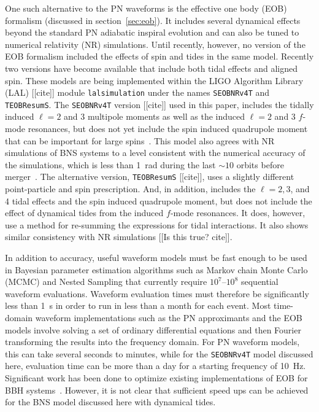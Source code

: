 \documentclass[prd,aps,letter,twocolumn,floatfix,notitlepage,nofootinbib]{revtex4-1}
\begin{document}
One such alternative to the PN waveforms is the effective one body (EOB) formalism (discussed in section~\ref{sec:eob}). It includes several dynamical effects beyond the standard PN adiabatic inspiral evolution and can also be tuned to numerical relativity (NR) simulations. Until recently, however, no version of the EOB formalism included the effects of spin and tides in the same model. Recently two versions have become available that include both tidal effects and aligned spin. These models are being implemented within the LIGO Algorithm Library (LAL) [[cite]] module \texttt{lalsimulation} under the names \texttt{SEOBNRv4T} and \texttt{TEOBResumS}. The \texttt{SEOBNRv4T} version [[cite]] used in this paper, includes the tidally induced $\ell=2$ and 3  multipole moments as well as the induced $\ell=2$ and 3 $f$-mode resonances, but does not yet include the spin induced quadrupole moment that can be important for large spins~\cite{Poisson, HarryHinderer2017}. This model also agrees with NR simulations of BNS systems to a level consistent with the numerical accuracy of the simulations, which is less than 1~rad during the last $\sim 10$ orbits before merger~\cite{DietrichHinderer2017, KiuchiKawaguchiKyutoku2017}. The alternative version, \texttt{TEOBResumS} [[cite]], uses a slightly different point-particle and spin prescription. And, in addition, includes the $\ell = 2, 3$, and 4 tidal effects and the spin induced quadrupole moment, but does not include the effect of dynamical tides from the induced $f$-mode resonances. It does, however, use a method for re-summing the expressions for tidal interactions. It also shows similar consistency with NR simulations [[Is this true? cite]].

In addition to accuracy, useful waveform models must be fast enough to be used in Bayesian parameter estimation algorithms such as Markov chain Monte Carlo (MCMC) and Nested Sampling that currently require $10^7$--$10^8$ sequential waveform evaluations. Waveform evaluation times must therefore be significantly less than 1~s in order to run in less than a month for each event. Most time-domain waveform implementations such as the PN approximants and the EOB models involve solving a set of ordinary differential equations and then Fourier transforming the results into the frequency domain. For PN waveform models, this can take several seconds to minutes, while for the \texttt{SEOBNRv4T} model discussed here, evaluation time can be more than a day for a starting frequency of 10~Hz. Significant work has been done to optimize existing implementations of EOB for BBH systems~\cite{DevineEtienneMcWilliams2016}. However, it is not clear that sufficient speed ups can be achieved for the BNS model discussed here with dynamical tides. 
\end{document}
